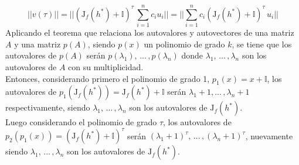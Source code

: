 \documentclass{article}
\begin{document}
	\begin{equation*}
	||v(\tau)|| = ||(\mathrm{J}_f(h^*) + \mathbb{I})^\tau \, \sum_{i=1}^{n} c_i u_i|| = || \sum_{i=1}^{n} c_i  (\mathrm{J}_f(h^*) + \mathbb{I})^\tau \, u_i||
	\end{equation*}
	Aplicando el teorema que relaciona los autovalores y autovectores de una matriz $A$ y una matriz $p(A)$, siendo $p(x)$ un polinomio de grado $k$, se tiene que los autovalores de $p(A)$ serán $p(\lambda_1), \,... \,, p(\lambda_n)$ donde $\lambda_1, \,... \,, \lambda_n$ son los autovalores de $A$ con su multiplicidad. \\
	Entonces, considerando primero el polinomio de grado 1, $p_1(x) = x + \mathbb{I}$, los autovalores de $p_1(\mathrm{J}_f(h^*)) = \mathrm{J}_f(h^*) + \mathbb{I}$ serán $\lambda_1 + 1, ... \,, \lambda_n + 1$ respectivamente, siendo $\lambda_1, \,... \,, \lambda_n$ son los autovalores de $\mathrm{J}_f(h^*)$. \\
	Luego considerando el polinomio de grado $\tau$, los autovalores de $p_2(p_1(x)) = (\mathrm{J}_f(h^*) + \mathbb{I})^\tau$ serán $(\lambda_1 + 1)^\tau, \,... \,, (\lambda_n + 1)^\tau$, nuevamente siendo $\lambda_1, \,... \,, \lambda_n$ son los autovalores de $\mathrm{J}_f(h^*)$.\\
	
\end{document}
